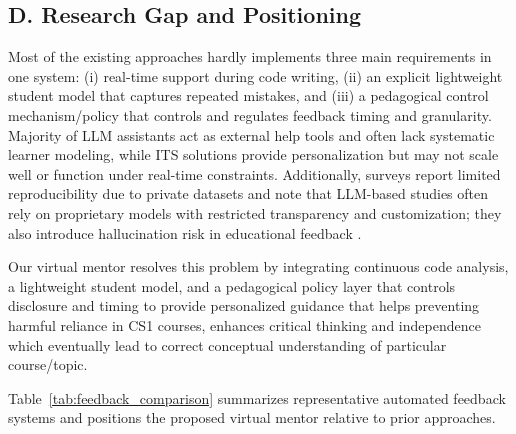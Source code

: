 \documentclass[conference]{IEEEtran}
\begin{document}
\subsection*{D. Research Gap and Positioning}

Most of the existing approaches hardly implements three main requirements in one system: (i) real-time support during code writing, (ii) an explicit lightweight student model that captures repeated mistakes, and (iii) a pedagogical control mechanism/policy that controls and regulates feedback timing and granularity. Majority of LLM assistants act as external help tools and often lack systematic learner modeling, while ITS solutions provide personalization but may not scale well or function under real-time constraints. Additionally, surveys report limited reproducibility due to private datasets and note that LLM-based studies often rely on proprietary models with restricted transparency and customization; they also introduce hallucination risk in educational feedback \cite{NavigatingAutomatedFeedback}.

Our virtual mentor resolves this problem by integrating continuous code analysis, a lightweight student model, and a pedagogical policy layer that controls disclosure and timing to provide personalized guidance that helps preventing harmful reliance in CS1 courses, enhances critical thinking and independence which eventually lead to correct conceptual understanding of particular course/topic.

Table~\ref{tab:feedback_comparison} summarizes representative automated feedback systems and positions the proposed virtual mentor relative to prior approaches.
\end{document}

